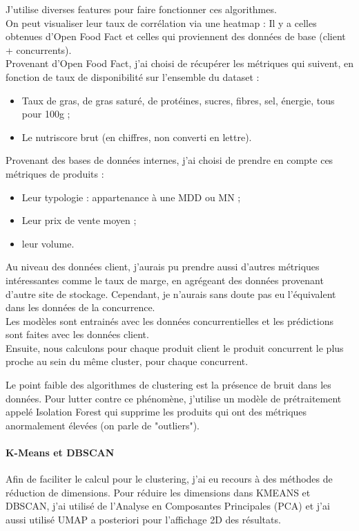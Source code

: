 \documentclass{rapportCS}
\begin{document}
J'utilise diverses features pour faire fonctionner ces algorithmes.\\
On peut visualiser leur taux de corrélation via une heatmap :
Il y a celles obtenues d'Open Food Fact et celles qui proviennent
des données de base (client + concurrents).\\
Provenant d'Open Food Fact, j'ai choisi de récupérer les métriques qui suivent, en
fonction de taux de disponibilité sur l'ensemble du dataset :
\begin{itemize}
  \item Taux de gras, de gras saturé, de protéines, sucres, fibres, sel, énergie, tous pour 100g ;
  \item Le nutriscore brut (en chiffres, non converti en lettre).
\end{itemize}

Provenant des bases de données internes, j'ai choisi de prendre en compte
ces métriques de produits :
\begin{itemize}
  \item Leur typologie : appartenance à une MDD ou MN ;
  \item Leur prix de vente moyen ;
  \item leur volume.
\end{itemize}

Au niveau des données client, j'aurais pu prendre aussi d'autres métriques
intéressantes comme le taux de marge,
en agrégeant des données provenant d'autre site de stockage.
Cependant, je n'aurais sans doute pas eu l'équivalent dans les données de la concurrence.\\

Les modèles sont entrainés avec les données concurrentielles et
les prédictions sont faites avec les données client.\\
Ensuite, nous calculons pour chaque produit client le produit concurrent 
le plus proche au sein du même cluster, pour chaque concurrent.

Le point faible des algorithmes de clustering est la présence de bruit dans les
données. Pour lutter contre ce phénomène, j'utilise un modèle de prétraitement
appelé Isolation Forest qui supprime les produits qui ont des métriques anormalement
élevées (on parle de "outliers").\\

\paragraph{K-Means et DBSCAN}
Afin de faciliter le calcul pour le clustering,
j'ai eu recours à des méthodes de réduction de dimensions.
Pour réduire les dimensions dans KMEANS et DBSCAN, j'ai utilisé de l'Analyse en Composantes
Principales (PCA) et j'ai aussi utilisé UMAP a posteriori pour l'affichage 2D des résultats.\\
\end{document}
